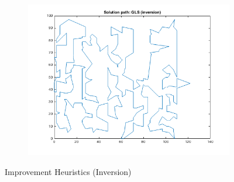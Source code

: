 \documentclass{paper}
\begin{document}
\begin{figure}[!h]
{    }
    \begin{subfigure}[]{\textwidth}
        \centering
        \includegraphics[width=0.7\linewidth]{GLS(inversion)}
    \end{subfigure}
    \caption{Improvement Heuristics (Inversion)}    
\label{fig:InversionPath}
\end{figure}
\end{document}
